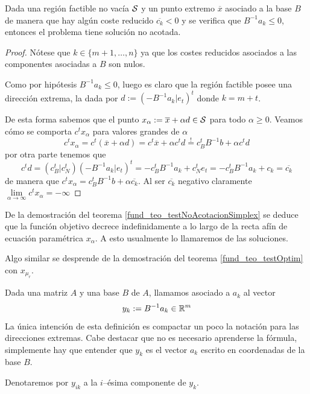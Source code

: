 \begin{theo}
	\label{fund_teo_testNoAcotacionSimplex}
	Dada una región factible no vacía $\mathcal{S}$ y un punto extremo $\overline{x}$ asociado a la base $B$ de manera que hay algún coste reducido $\overline{c_k}<0$ y se verifica que $B^{-1}a_k\leq 0$, entonces el problema tiene solución no acotada.
\end{theo}
\begin{proof}
	Nótese que $k\in\{m+1,\dots,n\}$ ya que los costes reducidos asociados a las componentes asociadas a $B$ son nulos.
	
	Como por hipótesis $B^{-1}a_k\leq 0$, luego es claro que la región factible posee una dirección extrema, la dada por $d:=(-B^{-1}a_k|e_t)^t$ donde $k=m+t$.
	
	De esta forma sabemos que el punto $x_\alpha:=\overline{x}+\alpha d\in\mathcal{S}$ para todo $\alpha\geq 0$. Veamos cómo se comporta $c^tx_\alpha$ para valores grandes de $\alpha$
	\begin{equation*}
		c^tx_\alpha=c^t(\overline{x}+\alpha d)=c^t\overline{x}+\alpha c^td\stackrel{!}{=}c_B^tB^{-1}b+\alpha c^td
	\end{equation*}
	por otra parte tenemos que
	\begin{equation*}
		c^td =(c_B^t|c_N^t)(-B^{-1}a_k|e_t)^t=-c_B^tB^{-1}a_k+c_N^te_t=-c_B^tB^{-1}a_k+c_k=\overline{c_k}
	\end{equation*}
	de manera que $c^tx_\alpha=c_B^tB^{-1}b+\alpha\overline{c_k}$. Al ser $\overline{c_k}$ negativo claramente $\lim\limits_{\alpha\to\infty}c^tx_\alpha=-\infty$
\end{proof}
\begin{obs}
	De la demostración del teorema \ref{fund_teo_testNoAcotacionSimplex} se deduce que la función objetivo decrece indefinidamente a lo largo de la recta afín de ecuación paramétrica $x_\alpha$. A esto usualmente lo llamaremos  de las soluciones.
	
	Algo similar se desprende de la demostración del teorema \ref{fund_teo_testOptim} con $x_{\mu_r}$.
\end{obs}
\begin{defi}
	\label{fund_defi_vectorAux}
	Dada una matriz $A$ y una base $B$ de $A$, llamamos  asociado a $a_k$ al vector
	\begin{equation*}
		y_k:=B^{-1}a_k\in\mathbb{R}^m
	\end{equation*}
	La única intención de esta definición es compactar un poco la notación para las direcciones extremas. Cabe destacar que no es necesario aprenderse la fórmula, simplemente hay que entender que $y_k$ es el vector $a_k$ escrito en coordenadas de la base $B$.
	
	Denotaremos por $y_{ik}$ a la $i$--ésima componente de $y_k$.
\end{defi}
